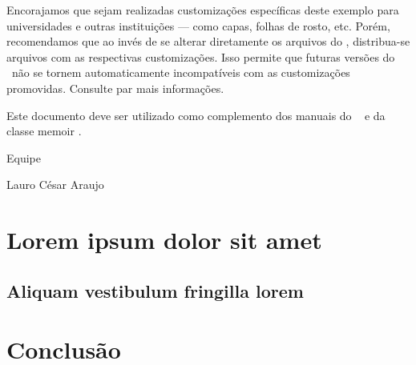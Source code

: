 \documentclass[
	12pt,				%
    oneside,			%
	a4paper,			%
	english,			%
	french,				%
	spanish,			%
	brazil,				%
	]{abntex2}
\begin{document}
Encorajamos que sejam realizadas customizações específicas deste exemplo para
universidades e outras instituições --- como capas, folhas de rosto, etc.
Porém, recomendamos que ao invés de se alterar diretamente os arquivos do
\abnTeX, distribua-se arquivos com as respectivas customizações.
Isso permite que futuras versões do \abnTeX~não se tornem automaticamente
incompatíveis com as customizações promovidas. Consulte
 par mais informações.

Este documento deve ser utilizado como complemento dos manuais do \abnTeX\ 
\cite{abntex2classe,abntex2cite,abntex2cite-alf} e da classe \textsf{memoir}
\cite{memoir}. 

Equipe \abnTeX 

Lauro César Araujo


\chapter{Lorem ipsum dolor sit amet}

\section{Aliquam vestibulum fringilla lorem}

\lipsum[1]  %

\lipsum[2-3]



\chapter*[Conclusão]{Conclusão}

\lipsum[31-33]


\postextual



%
%
\end{document}
